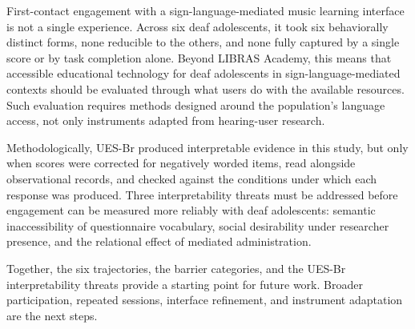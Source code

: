 \documentclass{llncs}
\begin{document}
First-contact engagement with a sign-language-mediated music learning interface is not a
single experience. Across six deaf adolescents, it took six behaviorally distinct forms,
none reducible to the others, and none fully captured by a single score or by task
completion alone. Beyond LIBRAS Academy, this means that accessible educational technology for deaf adolescents in sign-language-mediated contexts should be evaluated through what users do with the available resources. Such evaluation requires methods designed around the population's language access, not only instruments adapted from hearing-user research.

Methodologically, UES-Br produced interpretable
evidence in this study, but only when scores were corrected for negatively worded items,
read alongside observational records, and checked against the conditions under which
each response was produced. Three interpretability threats must be addressed before engagement can be measured more reliably with deaf adolescents: semantic inaccessibility of questionnaire vocabulary, social desirability under researcher presence, and the relational effect of mediated administration.

Together, the six trajectories, the barrier categories, and the UES-Br interpretability threats provide a starting point for future work. Broader participation, repeated
sessions, interface refinement, and instrument adaptation are the next steps.



\end{document}
